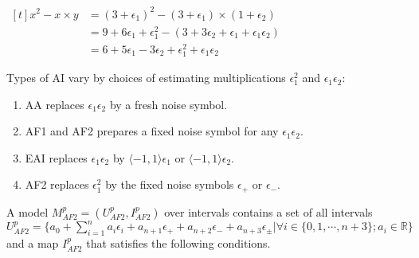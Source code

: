 \begin{center}
$\begin{aligned}[t]
    x^2 - x \times y  &= (3 + \epsilon_1)^2 - (3 + \epsilon_1) \times (1 + \epsilon_2)\\
     &= 9 + 6\epsilon_1 + \epsilon_1^2- (3 + 3\epsilon_2 + \epsilon_1 + \epsilon_1\epsilon_2) \\
     &= 6 + 5\epsilon_1 - 3\epsilon_2 + \epsilon_1^2 + \epsilon_1\epsilon_2
\end{aligned}$
\end{center}
Types of AI vary by choices of estimating multiplications $\epsilon_1^2$ and $\epsilon_1\epsilon_2$:
\begin{enumerate}
\item AA \cite{Comba93affinearithmetic, Stolfi97self-validatednumerical} replaces $\epsilon_1\epsilon_2$ by a fresh noise symbol. 
\item AF1 and AF2 \cite{Messine_extensionsof} prepares a fixed noise symbol for any $\epsilon_1\epsilon_2$.
\item EAI \cite{Ngoc:2009:ORE:1685167.1685421} replaces $\epsilon_1\epsilon_2$ by $\langle -1, 1 \rangle\epsilon_1$ or $\langle -1, 1 \rangle\epsilon_2$.
\item AF2 \cite{Messine_extensionsof} replaces $\epsilon_1^2$ by the fixed noise symbols $\epsilon_+$ or $\epsilon_-$.
\end{enumerate}
A model $M^p_{AF2} = (U^p_{AF2}, I^p_{AF2})$ over intervals contains a set of all intervals $U^p_{AF2} = \{a_0 + \sum\limits_{i=1}^{n}a_i\epsilon_i + a_{n+1}\epsilon_+ + a_{n+2}\epsilon_- + a_{n+3}\epsilon_{\pm} | \forall i \in \{0, 1, \cdots, n+3\}; a_i \in \mathbb{R}\}$ and a map $I^p_{AF2}$ that satisfies the following conditions.
